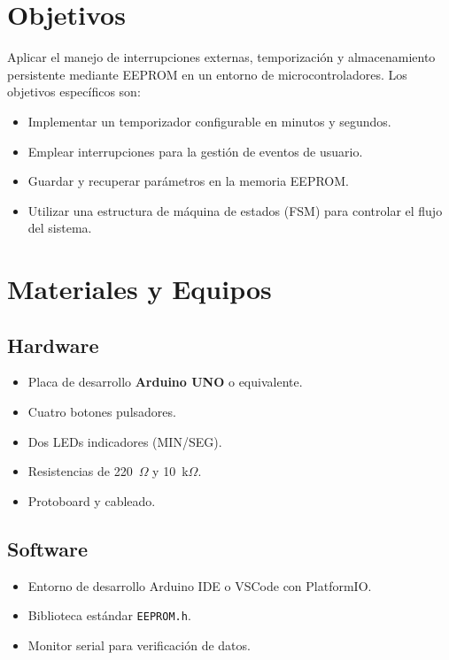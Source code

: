 \documentclass[12pt]{article}
\begin{document}
	\Portada
	\PaginaIndice
	\InicioContenido
		
	\section{Objetivos}
	Aplicar el manejo de interrupciones externas, temporización y almacenamiento persistente mediante EEPROM en un entorno de microcontroladores.  
	Los objetivos específicos son:
	\begin{itemize}
		\item Implementar un temporizador configurable en minutos y segundos.
		\item Emplear interrupciones para la gestión de eventos de usuario.
		\item Guardar y recuperar parámetros en la memoria EEPROM.
		\item Utilizar una estructura de máquina de estados (FSM) para controlar el flujo del sistema.
	\end{itemize}
	
	\section{Materiales y Equipos}
	\subsection{Hardware}
	\begin{itemize}
		\item Placa de desarrollo \textbf{Arduino UNO} o equivalente.
		\item Cuatro botones pulsadores.
		\item Dos LEDs indicadores (MIN/SEG).
		\item Resistencias de 220~$\Omega$ y 10~k$\Omega$.
		\item Protoboard y cableado.
	\end{itemize}
	
	\subsection{Software}
	\begin{itemize}
		\item Entorno de desarrollo Arduino IDE o VSCode con PlatformIO.
		\item Biblioteca estándar \texttt{EEPROM.h}.
		\item Monitor serial para verificación de datos.
	\end{itemize}
	
\end{document}
